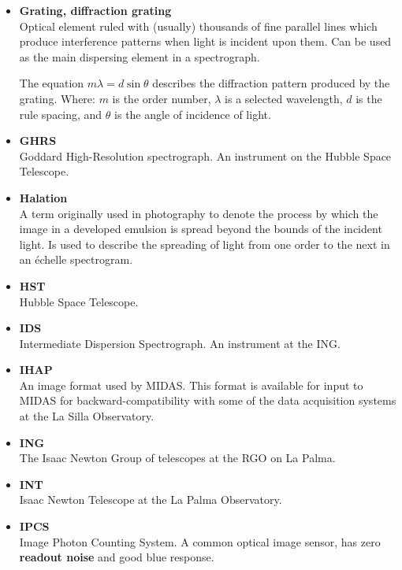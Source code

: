 \documentclass[twoside,11pt]{article}
\newcommand{\htmlref}[2]{#1}
\begin{document}
\begin{itemize}
\item {\bf\label{gl_grating}Grating, diffraction grating}\\
      Optical element ruled with (usually) thousands of fine parallel
      lines which produce interference patterns when light is incident
      upon them.  Can be used as the main dispersing element in a
      spectrograph.

      The equation $m\lambda = d\sin\theta$ describes the diffraction
      pattern produced by the grating.  Where: $m$ is the order number,
      $\lambda$ is a selected wavelength, $d$ is the rule spacing, and
      $\theta$ is the angle of incidence of light.

\item {\bf\label{gl_ghrs}GHRS}\\
      Goddard High-Resolution spectrograph.  An instrument on the
      Hubble Space Telescope.

\item {\bf\label{gl_halation}Halation}\\
      A term originally used in photography to denote the process by which
      the image in a developed emulsion is spread beyond the bounds of the
      incident light.  Is used to describe the spreading of light from
      one order to the next in an \'{e}chelle spectrogram.

\item {\bf\label{gl_hst}HST}\\
      Hubble Space Telescope.

\item {\bf\label{gl_ids}IDS}\\
      Intermediate Dispersion Spectrograph.  An instrument at the
      ING\@.

\item {\bf\label{gl_ihap}IHAP}\\
      An image format used by MIDAS.  This format is available for
      input to MIDAS for backward-compatibility with some of the
      data acquisition systems at the La Silla Observatory.

\item {\bf\label{gl_ing}ING}\\
      The Isaac Newton Group of telescopes at the RGO on La Palma.

\item {\bf\label{gl_int}INT}\\
      Isaac Newton Telescope at the La Palma Observatory.

\item {\bf\label{gl_ipcs}IPCS}\\
      Image Photon Counting System.  A common optical image sensor,
      has zero \htmlref{{\bf readout noise}}{gl_readout_noise} and good blue
      response.


\end{itemize}
\end{document}
